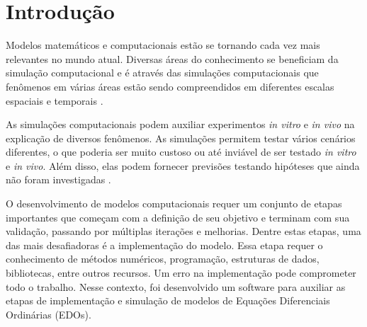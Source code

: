 \documentclass[
	12pt,				%
	openright,			%
	oneside,			%
	a4paper,			%
	main=brazil,
	english,			%
	]{ufsj-abntex2}
\begin{document}


\chapter{Introdução}

Modelos matemáticos e computacionais estão se tornando cada vez mais relevantes no mundo atual. Diversas áreas do conhecimento se beneficiam da simulação computacional e é através das simulações computacionais que fenômenos em várias áreas estão sendo compreendidos em diferentes escalas espaciais e temporais \cite{MARTINS201018}. 

As simulações computacionais podem auxiliar experimentos \textit{in vitro} e \textit{in vivo} na explicação de diversos fenômenos. As simulações permitem testar vários cenários diferentes, o que poderia ser muito custoso ou até inviável de ser testado \textit{in vitro} e \textit{in vivo}. Além disso, elas podem fornecer previsões testando hipóteses que ainda não foram investigadas \cite{Walpole2013MultiscaleCM}. 

O desenvolvimento de modelos computacionais requer um conjunto de etapas importantes que começam com a definição de seu objetivo e terminam com sua validação, passando por múltiplas iterações e melhorias. Dentre estas etapas, uma das mais desafiadoras é a implementação do modelo. Essa etapa requer o conhecimento de métodos numéricos, programação, estruturas de dados, bibliotecas, entre outros recursos. Um erro na implementação pode comprometer todo o trabalho. Nesse contexto, foi desenvolvido um software para auxiliar as etapas de implementação e simulação de modelos de 
Equações Diferenciais Ordinárias (EDOs).
\end{document}

